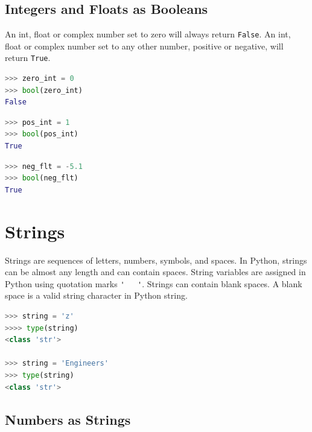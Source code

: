 \documentclass{book}
\begin{document}
    
        \subsection{Integers and Floats as
Booleans}\label{integers-and-floats-as-booleans}

An int, float or complex number set to zero will always return
\lstinline!False!. An int, float or complex number set to any other
number, positive or negative, will return \lstinline!True!.

\begin{lstlisting}[language=Python]
>>> zero_int = 0
>>> bool(zero_int)
False
\end{lstlisting}

\begin{lstlisting}[language=Python]
>>> pos_int = 1
>>> bool(pos_int)
True
\end{lstlisting}

\begin{lstlisting}[language=Python]
>>> neg_flt = -5.1
>>> bool(neg_flt)
True
\end{lstlisting}
    




    
        \section{Strings}\label{strings}
    




    
        Strings are sequences of letters, numbers, symbols, and spaces. In
Python, strings can be almost any length and can contain spaces. String
variables are assigned in Python using quotation marks
\lstinline!'   '!. Strings can contain blank spaces. A blank space is a
valid string character in Python string.

\begin{lstlisting}[language=Python]
>>> string = 'z'
>>>> type(string)
<class 'str'>

>>> string = 'Engineers'
>>> type(string)
<class 'str'>
\end{lstlisting}
    




    
        \subsection{Numbers as Strings}\label{numbers-as-strings}
\end{document}
